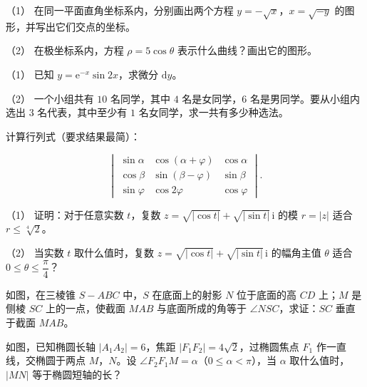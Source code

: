 \begin{question}
（1） 在同一平面直角坐标系内，分别画出两个方程 $y=-\sqrt{x}$，$x=\sqrt{-y}$ 的图形，并写出它们交点的坐标。

（2） 在极坐标系内，方程 $\rho=5\cos\theta$ 表示什么曲线？画出它的图形。

\end{question}
\begin{question}
（1） 已知 $y=\mathrm e^{-x}\sin 2x$，求微分 $\mathrm dy$。

（2） 一个小组共有 $10$ 名同学，其中 $4$ 名是女同学，$6$ 名是男同学。要从小组内选出 $3$ 名代表，其中至少有 $1$ 名女同学，求一共有多少种选法。

\end{question}
\begin{question}
计算行列式（要求结果最简）：

\nopagebreak[4]
\[
\begin{vmatrix}
\sin\alpha & \cos(\alpha+\varphi) & \cos\alpha\\
\cos\beta & \sin(\beta-\varphi) & \sin\beta\\
\sin\varphi & \cos 2\varphi & \cos\varphi
\end{vmatrix}.
\]

\end{question}
\begin{question}
（1） 证明：对于任意实数 $t$，复数 $z=\sqrt{\lvert\cos t\rvert}+\sqrt{\lvert\sin t\rvert}\,\mathrm i$ 的模 $r=\lvert z\rvert$ 适合 $r\leqslant\sqrt[4]{2}$。

（2） 当实数 $t$ 取什么值时，复数 $z=\sqrt{\lvert\cos t\rvert}+\sqrt{\lvert\sin t\rvert}\,\mathrm i$ 的幅角主值 $\theta$ 适合 $0\leqslant\theta\leqslant\dfrac{\pi}{4}$？

\Needspace{0.4\textheight}
\end{question}
\begin{question}
如图，在三棱锥 $S-ABC$ 中，$S$ 在底面上的射影 $N$ 位于底面的高 $CD$ 上；$M$ 是侧棱 $SC$ 上的一点，使截面 $MAB$ 与底面所成的角等于 $\angle NSC$，求证：$SC$ 垂直于截面 $MAB$。
\nopagebreak[4]
\begin{center}\end{center}
\nopagebreak[4]
\Needspace{0.4\textheight}
\end{question}
\begin{question}
如图，已知椭圆长轴 $\lvert A_1A_2\rvert=6$，焦距 $\lvert F_1F_2\rvert=4\sqrt2$，过椭圆焦点 $F_1$ 作一直线，交椭圆于两点 $M$，$N$。设 $\angle F_2F_1M=\alpha$（$0\leqslant\alpha<\pi$），当 $\alpha$ 取什么值时，$\lvert MN\rvert$ 等于椭圆短轴的长？
\nopagebreak[4]
\begin{center}\end{center}
\nopagebreak[4]
\end{question}
